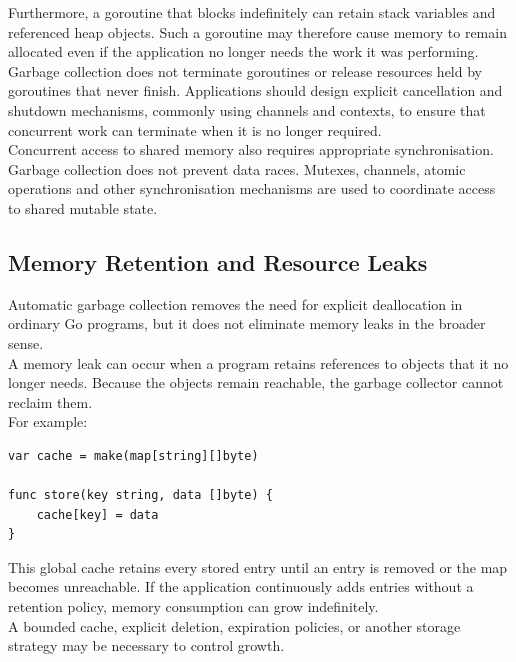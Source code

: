 Furthermore, a goroutine that blocks indefinitely can retain stack variables and referenced heap objects. Such a goroutine may therefore cause memory to remain allocated even if the application no longer needs the work it was performing.\\

Garbage collection does not terminate goroutines or release resources held by goroutines that never finish. Applications should design explicit cancellation and shutdown mechanisms, commonly using channels and contexts, to ensure that concurrent work can terminate when it is no longer required.\\

Concurrent access to shared memory also requires appropriate synchronisation. Garbage collection does not prevent data races. Mutexes, channels, atomic operations and other synchronisation mechanisms are used to coordinate access to shared mutable state.\\

\subsection{Memory Retention and Resource Leaks}

Automatic garbage collection removes the need for explicit deallocation in ordinary Go programs, but it does not eliminate memory leaks in the broader sense.\\

A memory leak can occur when a program retains references to objects that it no longer needs. Because the objects remain reachable, the garbage collector cannot reclaim them.\\

For example:

\begin{lstlisting}
var cache = make(map[string][]byte)

func store(key string, data []byte) {
    cache[key] = data
}
\end{lstlisting}

This global cache retains every stored entry until an entry is removed or the map becomes unreachable. If the application continuously adds entries without a retention policy, memory consumption can grow indefinitely.\\

A bounded cache, explicit deletion, expiration policies, or another storage strategy may be necessary to control growth.\\

